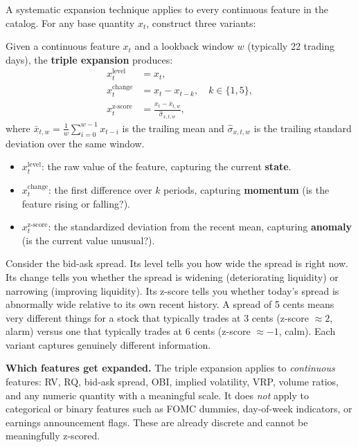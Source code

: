 A systematic expansion technique applies to every continuous feature in the catalog.
For any base quantity $x_t$, construct three variants:

\begin{definition}
Given a continuous feature $x_t$ and a lookback window $w$ (typically 22 trading days), the \textbf{triple expansion} produces:
\begin{align}
x_t^{\text{level}} &= x_t, \label{eq:triple-level}\\
x_t^{\text{change}} &= x_t - x_{t-k}, \quad k \in \{1, 5\}, \label{eq:triple-change}\\
x_t^{\text{z-score}} &= \frac{x_t - \bar{x}_{t,w}}{\hat{\sigma}_{x,t,w}}, \label{eq:triple-zscore}
\end{align}
where $\bar{x}_{t,w} = \frac{1}{w}\sum_{i=0}^{w-1} x_{t-i}$ is the trailing mean and $\hat{\sigma}_{x,t,w}$ is the trailing standard deviation over the same window.
\end{definition}

\begin{itemize}[nosep]
  \item $x_t^{\text{level}}$: the raw value of the feature, capturing the current \textbf{state}.
  \item $x_t^{\text{change}}$: the first difference over $k$ periods, capturing \textbf{momentum} (is the feature rising or falling?).
  \item $x_t^{\text{z-score}}$: the standardized deviation from the recent mean, capturing \textbf{anomaly} (is the current value unusual?).
\end{itemize}

\begin{intuition}
Consider the bid-ask spread. Its level tells you how wide the spread is right now. Its change tells you whether the spread is widening (deteriorating liquidity) or narrowing (improving liquidity). Its z-score tells you whether today's spread is abnormally wide relative to its own recent history. A spread of 5 cents means very different things for a stock that typically trades at 3 cents (z-score $\approx 2$, alarm) versus one that typically trades at 6 cents (z-score $\approx -1$, calm). Each variant captures genuinely different information.
\end{intuition}

\textbf{Which features get expanded.}
The triple expansion applies to \emph{continuous} features: RV, RQ, bid-ask spread, OBI, implied volatility, VRP, volume ratios, and any numeric quantity with a meaningful scale.
It does \emph{not} apply to categorical or binary features such as FOMC dummies, day-of-week indicators, or earnings announcement flags.
These are already discrete and cannot be meaningfully z-scored.

